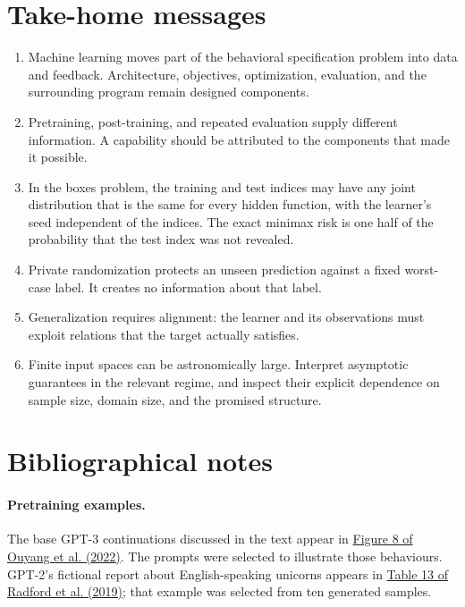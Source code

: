 \documentclass[11pt,twoside]{article}
\theoremstyle{definition}
\theoremstyle{remark}
\begin{document}
\section{Take-home messages}
\label{sec:take-home}

\begin{enumerate}[leftmargin=*,itemsep=0.25em,topsep=0.4em]
\item Machine learning moves part of the behavioral specification problem into
data and feedback. Architecture, objectives, optimization, evaluation, and the
surrounding program remain designed components.
\item Pretraining, post-training, and repeated evaluation supply different
information. A capability should be attributed to the components that made it
possible.
\item In the boxes problem, the training and test indices may have any joint
distribution that is the same for every hidden function, with the learner's
seed independent of the indices. The exact minimax risk is one half of the
probability that the test index was not revealed.
\item Private randomization protects an unseen prediction against a fixed
worst-case label. It creates no information about that label.
\item Generalization requires alignment: the learner and its observations must
exploit relations that the target actually satisfies.
\item Finite input spaces can be astronomically large. Interpret asymptotic
guarantees in the relevant regime, and inspect their explicit dependence on
sample size, domain size, and the promised structure.
\end{enumerate}

\printendnotes

\section*{Bibliographical notes}
\label{sec:bibliographical-notes}

\paragraph{Pretraining examples.}
The base GPT-3 continuations discussed in the text appear in
\href{https://arxiv.org/html/2203.02155v1\#S4.F8}{Figure 8 of Ouyang et al. (2022)}.
The prompts were selected to illustrate those behaviours.
GPT-2's fictional report about English-speaking unicorns appears in
\href{https://cdn.openai.com/better-language-models/language_models_are_unsupervised_multitask_learners.pdf\#page=20}{Table 13 of Radford et al. (2019)};
that example was selected from ten generated samples.
\end{document}
